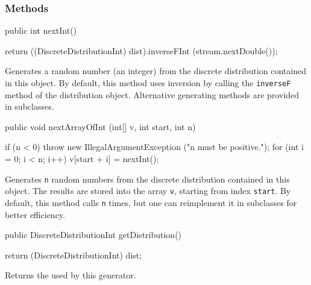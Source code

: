 \subsubsection* {Methods}
\begin{code}

   public int nextInt() \begin{hide} {
      return ((DiscreteDistributionInt) dist).inverseFInt (stream.nextDouble());
   }\end{hide}
\end{code}
  \begin{tabb}
    Generates a random number (an integer) from the discrete
    distribution contained in this object.
    By default, this method uses inversion by calling the \texttt{inverseF}
    method of the distribution object.
    Alternative generating methods are provided in subclasses.
 \end{tabb}
\begin{htmlonly}
\end{htmlonly}
\begin{code}

   public void nextArrayOfInt (int[] v, int start, int n) \begin{hide} {
      if (n < 0)
         throw new IllegalArgumentException ("n must be positive.");
      for (int i = 0; i < n; i++)
         v[start + i] = nextInt();
   }\end{hide}
\end{code}
  \begin{tabb} Generates \texttt{n} random numbers from the discrete distribution
    contained in this object.  The results are stored into the array \texttt{v},
    starting from index \texttt{start}.
    By default, this method calls  \texttt{n}
   times, but one can reimplement it in subclasses for better efficiency.
 \end{tabb}
\begin{htmlonly}
\end{htmlonly}
\begin{code}

   public DiscreteDistributionInt getDistribution() \begin{hide} {
      return (DiscreteDistributionInt) dist;
   }\end{hide}
\end{code}
\begin{tabb}
  Returns the  used by this generator.
\end{tabb}
\begin{htmlonly}
\end{htmlonly}
\begin{code}\begin{hide}
}\end{hide}
\end{code}
